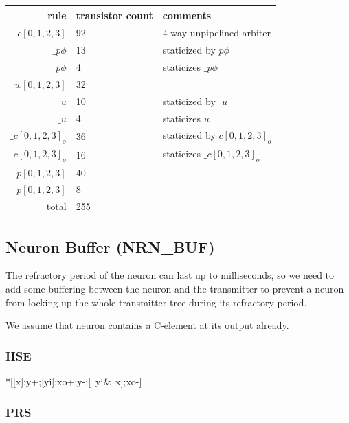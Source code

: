 \documentclass{article}
\begin{document}
\begin{center}
    \begin{tabular}{|r|l|l|}
    \hline
    rule & transistor count & comments \\ \hline
    $c[0,1,2,3]$ & 92 & 4-way unpipelined arbiter \\ \hline
    $\_p\phi$ & 13 & staticized by $p\phi$ \\ \hline
    $p\phi$ & 4 & staticizes $\_p\phi$ \\ \hline
    $\_w[0,1,2,3]$ & 32 & \\ \hline
    $u$ & 10 & staticized by $\_u$ \\ \hline
    $\_u$ & 4 & staticizes $u$ \\ \hline
    $\_c[0,1,2,3]_o$ & 36 & staticized by $c[0,1,2,3]_o$ \\ \hline
    $c[0,1,2,3]_o$ & 16 & staticizes $\_c[0,1,2,3]_o$\\ \hline
    $p[0,1,2,3]$ & 40 & \\ \hline
    $\_p[0,1,2,3]$ & 8 & \\ \hline
    \hline total & 255 & \\ \hline
    \end{tabular}
\end{center}

\subsection{Neuron Buffer (NRN\_BUF) \label{sec:AEXT_NRN_BUF}}

The refractory period of the neuron can last up to milliseconds, so we need to
add some buffering between the neuron and the transmitter to prevent a neuron
from locking up the whole transmitter tree during its refractory period.

We assume that neuron contains a C-element at its output already.

\subsubsection{HSE}

\begin{hse}
*[[x\phi];y\phi+;[yi];xo+;y\phi-;[~yi&~x\phi];xo-]
\end{hse}

\subsubsection{PRS}
\end{document}
